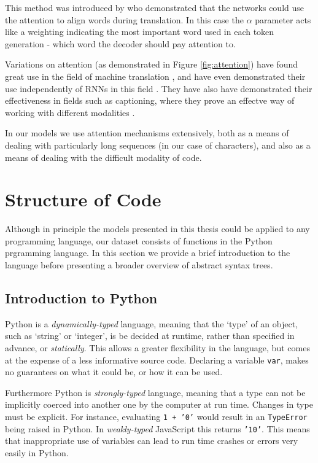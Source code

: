 This method was introduced by \citet{bahdanau_neural_2014} who demonstrated that the networks could use the attention to align words during translation.
In this case the $\alpha$ parameter acts like a weighting indicating the most important word used in each token generation - which word the decoder should pay attention to.

Variations on attention (as demonstrated in Figure \ref{fig:attention}) have found great use in the field of machine translation  \citep{luong_effective_2015}, and have even demonstrated their use independently of RNNs in this field \citep{vaswani_attention_2017}.  They have also have demonstrated their effectiveness in fields such as captioning, where they prove an effectve way of working with different modalities \citep{xu_show_2015}.

In our models we use attention mechanisms extensively, both as a means of dealing with particularly long sequences (in our case of characters), and also as a means of dealing with the difficult modality of code.




\section{Structure of Code} %
\label{sec:translating_code}

Although in principle the models presented in this thesis could be applied to any programming language, our dataset consists of functions in the Python prgramming language.  
In this section we provide a brief introduction to the language before presenting a broader overview of abstract syntax trees.

\subsection{Introduction to Python} %
\label{sub:python}

Python is a \textit{dynamically-typed} language, meaning that the `type' of an object, such as `string' or `integer', is be decided at runtime, rather than specified in advance, or \textit{statically}.
This allows a greater flexibility in the language, but comes at the expense of a less informative source code.
Declaring a variable \texttt{var}, makes no guarantees on what it could be, or how it can be used. 

Furthermore Python is \textit{strongly-typed} language, meaning that a type can not be implicitly coerced into another one by the computer at run time. Changes in type must be explicit. For instance, evaluating \texttt{1 + '0'} would result in an \texttt{TypeError} being raised in Python. In \textit{weakly-typed} JavaScript this returns \texttt{'10'}.
This means that inappropriate use of variables can lead to run time crashes or errors very easily in Python.

